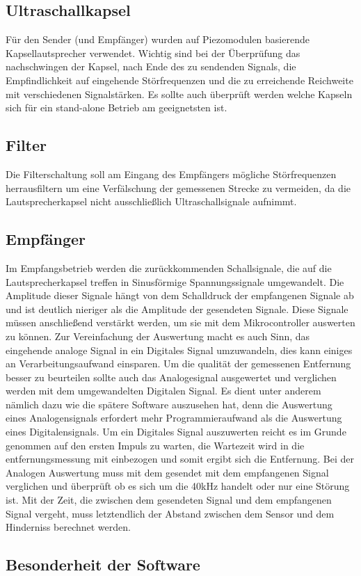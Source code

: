 \subsection{Ultraschallkapsel}
Für den Sender (und Empfänger) wurden auf Piezomodulen basierende Kapsellautsprecher verwendet.  Wichtig sind bei der Überprüfung das nachschwingen der Kapsel, nach Ende des zu sendenden Signals, die Empfindlichkeit auf eingehende Störfrequenzen und die zu erreichende Reichweite mit verschiedenen Signalstärken. Es sollte auch überprüft werden welche Kapseln sich für ein stand-alone Betrieb am geeignetsten ist.
\subsection{Filter}
Die Filterschaltung soll am Eingang des Empfängers mögliche Störfrequenzen herrausfiltern um eine Verfälschung der gemessenen Strecke zu vermeiden, da die Lautsprecherkapsel nicht ausschließlich Ultraschallsignale aufnimmt.

\subsection{Empfänger}
Im Empfangsbetrieb werden die zurückkommenden Schallsignale, die auf die Lautsprecherkapsel treffen in Sinusförmige Spannungssignale umgewandelt. Die Amplitude dieser Signale hängt von dem Schalldruck der empfangenen Signale ab und ist deutlich nieriger als die Amplitude der gesendeten Signale. Diese Signale müssen anschließend verstärkt werden, um sie mit dem Mikrocontroller auswerten zu können. Zur Vereinfachung der Auswertung macht es auch Sinn, das eingehende analoge Signal in ein Digitales Signal umzuwandeln, dies kann einiges an Verarbeitungsaufwand einsparen. Um die qualität der gemessenen Entfernung besser zu beurteilen sollte auch das Analogesignal ausgewertet und verglichen werden mit dem umgewandelten Digitalen Signal. Es dient unter anderem nämlich dazu wie die spätere Software auszusehen hat, denn die Auswertung eines Analogensignals erfordert mehr Programmieraufwand als die Auswertung eines Digitalensignals. Um ein Digitales Signal auszuwerten reicht es im Grunde genommen auf den ersten Impuls zu warten, die Wartezeit wird in die entfernungsmessung mit einbezogen und somit ergibt sich die Entfernung. Bei der Analogen Auswertung muss mit dem gesendet mit dem empfangenen Signal verglichen und überprüft ob es sich um die 40kHz handelt oder nur eine Störung ist.
Mit der Zeit, die zwischen dem gesendeten Signal und dem empfangenen Signal vergeht, muss letztendlich der Abstand zwischen dem Sensor und dem Hinderniss berechnet werden.
\subsection{Besonderheit der Software}
